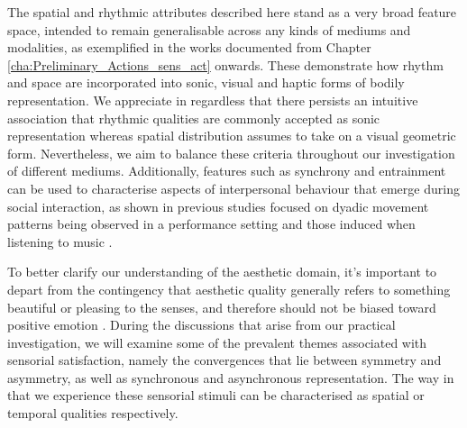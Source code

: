 The spatial and rhythmic attributes described here stand as a very broad feature space, intended to remain generalisable across any kinds of mediums and modalities, as exemplified in the works documented from Chapter \ref{cha:Preliminary_Actions_sens_act} onwards. These demonstrate how rhythm and space are incorporated into sonic, visual and haptic forms of bodily representation. We appreciate in regardless that there persists an intuitive association that rhythmic qualities are commonly accepted as sonic representation whereas spatial distribution assumes to take on a visual geometric form. Nevertheless, we aim to balance these criteria throughout our investigation of different mediums. Additionally, features such as synchrony and entrainment can be used to characterise aspects of interpersonal behaviour that emerge during social interaction, as shown in previous studies focused on dyadic movement patterns being observed in a performance setting \cite{ward_sensing_2018} and those induced when listening to music \cite{scurto_entrain_2019,danielsen_moving_2015}.

To better clarify our understanding of the aesthetic domain, it’s important to depart from the contingency that aesthetic quality generally refers to something beautiful or pleasing to the senses, and therefore should not be biased toward positive emotion \cite{fingerhut_aesthetic_2020}. During the discussions that arise from our practical investigation,
we will examine some of the prevalent themes associated with sensorial satisfaction, namely the convergences that lie between symmetry and asymmetry, as well as synchronous and asynchronous representation. The way in that we experience these sensorial stimuli can be characterised as spatial or temporal qualities respectively.
